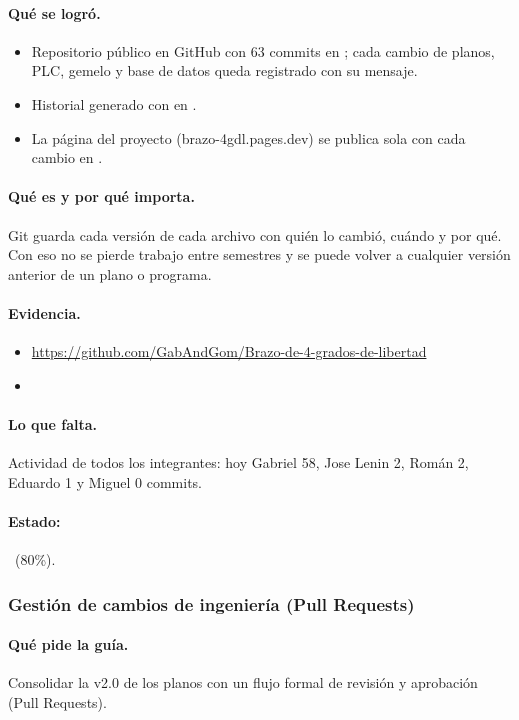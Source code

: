 \documentclass[a4paper,11pt]{article}
\begin{document}
\paragraph{Qué se logró.}
\begin{itemize}
\item Repositorio público en GitHub con 63 commits en ; cada cambio de planos, PLC, gemelo y base de datos queda registrado con su mensaje.
\item Historial generado con  en .
\item La página del proyecto (brazo-4gdl.pages.dev) se publica sola con cada cambio en .
\end{itemize}
\paragraph{Qué es y por qué importa.} Git guarda cada versión de cada archivo con quién lo cambió, cuándo y por qué. Con eso no se pierde trabajo entre semestres y se puede volver a cualquier versión anterior de un plano o programa.
\paragraph{Evidencia.}
\begin{itemize}\small
\item \url{https://github.com/GabAndGom/Brazo-de-4-grados-de-libertad}
\item {}
\end{itemize}
\paragraph{Lo que falta.} Actividad de todos los integrantes: hoy Gabriel 58, Jose Lenin 2, Román 2, Eduardo 1 y Miguel 0 commits.
\paragraph{Estado:} \parcial~(80\%).
\subsubsection{Gestión de cambios de ingeniería (Pull Requests)}
\paragraph{Qué pide la guía.} Consolidar la v2.0 de los planos con un flujo formal de revisión y aprobación (Pull Requests).
\end{document}
